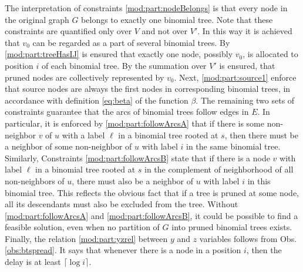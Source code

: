 The interpretation of constraints \eqref{mod:part:nodeBelongs} is that every node in the original graph $G$ belongs to exactly one binomial tree.
Note that these constraints are quantified only over $V$ and not over $V'$.
In this way it is achieved that $v_0$ can be regarded as a part of several binomial trees.
By \eqref{mod:part:treeHasIJ} is ensured that exactly one node, possibly $v_0$, is allocated to position $i$ of each binomial tree.
By the summation over $V'$ is ensured, that pruned nodes are collectively represented by $v_0$.
Next, \eqref{mod:part:source1} enforce that source nodes are always the first nodes in corresponding binomial trees, in accordance with definition \eqref{eq:beta} of the function $\beta$.
The remaining two sets of constraints guarantee that the arcs of binomial trees follow edges in $E$.
In particular, it is enforced by \eqref{mod:part:followArcsA} that if there is some  non-neighbor $v$ of $u$  with a label $\ell$ in a binomial tree rooted at $s$,
then there must be a neighbor of some non-neighbor of $u$ with label $i$ in the same binomial tree.
Similarly, Constraints \eqref{mod:part:followArcsB} state that if there is a node $v$ with label $\ell$ in a binomial tree rooted at $s$ in the complement of neighborhood of all non-neighbors of $u$,
there must also be a neighbor of $u$ with label $i$ in this binomial tree.
This reflects the obvious fact that if a tree is pruned at some node, all its descendants must also be excluded from the tree.
Without \eqref{mod:part:followArcsA} and \eqref{mod:part:followArcsB}, it could be possible to find a feasible solution, even when no partition of $G$ into pruned binomial trees exists.
Finally, the relation \eqref{mod:part:yzrel} between $y$ and $z$ variables follows from Obs. \ref{obs:btspread}.
It says that whenever there is a node in a position $i$, then the delay is at least $\lceil\log i\rceil$.
%
